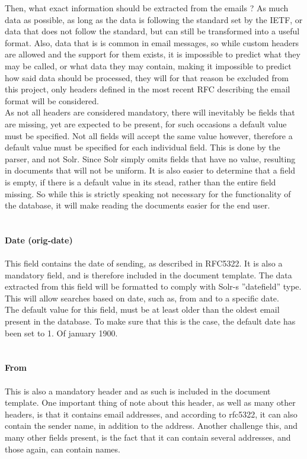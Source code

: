 \documentclass{report}
\begin{document}
Then, what exact information should be extracted from the emails ?
As much data as possible, as long as the data is following the standard set by the IETF, or data that does not follow the standard, but can still be transformed into a useful format. Also, data that is is common in email messages, so while custom headers are allowed and the support for them exists, it is impossible to predict what they may be called, or what data they may contain, making it impossible to predict how said data should be processed, they will for that reason be excluded from this project, only headers defined in the most recent RFC describing the email format will be considered.
\\
As not all headers are considered mandatory, there will inevitably be fields that are missing, yet are expected to be present, for such occasions a default value must be specified. Not all fields will accept the same value however, therefore a default value must be specified for each individual field. This is done by the parser, and not Solr. Since Solr simply omits fields that have no value, resulting in documents that will not be uniform. It is also easier to determine that a field is empty, if there is a default value in its stead, rather than the entire field missing. So while this is strictly speaking not necessary for the functionality of the database, it will make reading the documents easier for the end user.
\\
\\\\\textbf{Date (orig-date)}\\\\
This field contains the date of sending, as described in RFC5322. It is also a mandatory field, and is therefore included in the document template. The data extracted from this field will be formatted to comply with Solr-s ”datefield” type. This will allow searches based on date, such as, from and to a specific date.  
\\
The default value for this field, must be at least older than the oldest email present in the database. To make sure that this is the case, the default date has been set to 1. Of january 1900.
\\
\\\\\textbf{From} \\\\
This is also a mandatory header and as such is included in the document template.
One important thing of note about this header, as well as many other headers, is that it contains email addresses, and according to rfc5322, it can also contain the sender name, in addition to the address. Another challenge this, and many other fields present, is the fact that it can contain several addresses, and those again, can contain names.
\end{document}
